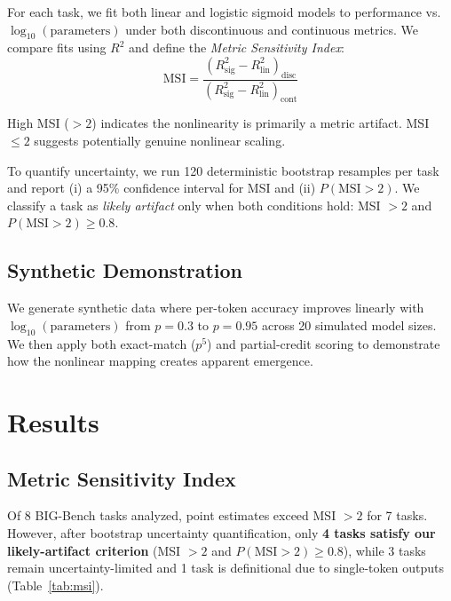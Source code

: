 \documentclass[11pt,a4paper]{article}
\begin{document}
For each task, we fit both linear and logistic sigmoid models to performance vs.\ $\log_{10}(\text{parameters})$ under both discontinuous and continuous metrics. We compare fits using $R^2$ and define the \emph{Metric Sensitivity Index}:
\begin{equation}
    \text{MSI} = \frac{(R^2_{\text{sig}} - R^2_{\text{lin}})_{\text{disc}}}{(R^2_{\text{sig}} - R^2_{\text{lin}})_{\text{cont}}}
\end{equation}

High MSI ($> 2$) indicates the nonlinearity is primarily a metric artifact. MSI $\leq 2$ suggests potentially genuine nonlinear scaling.

To quantify uncertainty, we run 120 deterministic bootstrap resamples per task and report (i) a 95\% confidence interval for MSI and (ii) $P(\text{MSI}>2)$.
We classify a task as \emph{likely artifact} only when both conditions hold: MSI $>2$ and $P(\text{MSI}>2)\geq 0.8$.

\subsection{Synthetic Demonstration}

We generate synthetic data where per-token accuracy improves linearly with $\log_{10}(\text{parameters})$ from $p=0.3$ to $p=0.95$ across 20 simulated model sizes. We then apply both exact-match ($p^5$) and partial-credit scoring to demonstrate how the nonlinear mapping creates apparent emergence.

\section{Results}

\subsection{Metric Sensitivity Index}

Of 8 BIG-Bench tasks analyzed, point estimates exceed MSI $>2$ for 7 tasks. However, after bootstrap uncertainty quantification, only \textbf{4 tasks satisfy our likely-artifact criterion} (MSI $>2$ and $P(\text{MSI}>2)\geq 0.8$), while 3 tasks remain uncertainty-limited and 1 task is definitional due to single-token outputs (Table~\ref{tab:msi}).
\end{document}
